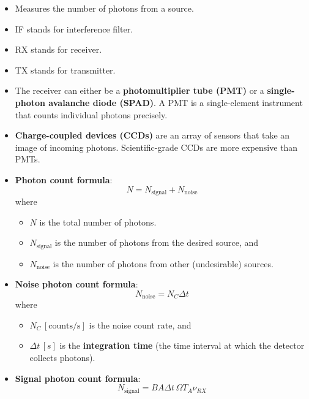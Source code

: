 \begin{itemize}
    \item Measures the number of photons from a source.
    \item IF stands for interference filter.
    \item RX stands for receiver.
    \item TX stands for transmitter.
    \item The receiver can either be a \textbf{photomultiplier tube (PMT)} or a \textbf{single-photon avalanche diode (SPAD)}. A PMT is a single-element instrument that counts individual photons precisely.
    \item \textbf{Charge-coupled devices (CCDs)} are an array of sensors that take an image of incoming photons. Scientific-grade CCDs are more expensive than PMTs.
    \item \textbf{Photon count formula}:
          \begin{equation*}
              N = N_{\text{signal}} + N_{\text{noise}}
          \end{equation*}
          where
          \begin{itemize}
              \item $N$ is the total number of photons.
              \item $N_{\text{signal}}$ is the number of photons from the desired source, and
              \item $N_{\text{noise}}$ is the number of photons from other (undesirable) sources.
          \end{itemize}
    \item \textbf{Noise photon count formula}:
          \begin{equation*}
              N_{\text{noise}} = N_C \Delta t
          \end{equation*}
          where
          \begin{itemize}
              \item $N_C \, [\text{counts/s}]$ is the noise count rate, and
              \item $\Delta t \, [s]$ is the \textbf{integration time} (the time interval at which the detector collects photons).
          \end{itemize}
    \item \textbf{Signal photon count formula}:
          \begin{equation*}
              N_{\text{signal}} = BA\Delta t \, \Omega T_A \nu_{RX}
          \end{equation*}

\end{itemize}
